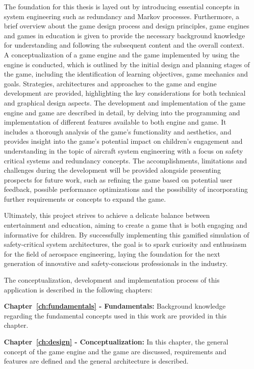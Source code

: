 The foundation for this thesis is layed out by introducing essential concepts in system engineering such as redundancy and Markov processes.
Furthermore, a brief overview about the game design process and design principles, game engines and games in education is given to
provide the necessary background knowledge for understanding and following the subsequent content and the overall context.
A conceptualization of a game engine and the game implemented by using the engine is conducted, which is outlined by the initial
design and planning stages of the game, including the identification of learning objectives, game mechanics and goals.
Strategies, architectures and approaches to the game and engine development are provided, highlighting the key considerations for both
technical and graphical design aspects.
The development and implementation of the game engine and game are described in detail, by delving into the programming and implementation of
different features available to both engine and game.
It includes a thorough analysis of the game's functionality and aesthetics, and provides insight into the game's potential impact on children's
engagement and understanding in the topic of aircraft system engineering with a focus on safety critical systems and redundancy concepts.
The accomplishments, limitations and challenges during the development will be provided alongside presenting prospects for future work, such
as refining the game based on potential user feedback, possible performance optimizations and the possibility of incorporating further requirements or
concepts to expand the game.

Ultimately, this project strives to achieve a delicate balance between entertainment and education,
aiming to create a game that is both engaging and informative for children.
By successfully implementing this gamified simulation of safety-critical system architectures,
the goal is to spark curiosity and enthusiasm for the field of aerospace engineering,
laying the foundation for the next generation of innovative and safety-conscious professionals in the industry.


The conceptualization, development and implementation process of this application is described in the following chapters:

\textbf{Chapter~\ref{ch:fundamentals} - Fundamentals:} Background knowledge regarding the fundamental concepts used
in this work are provided in this chapter.

\textbf{Chapter~\ref{ch:design} - Conceptualization:} In this chapter, the general concept of the game engine and
the game are discussed, requirements and features are defined and the general architecture is described.

